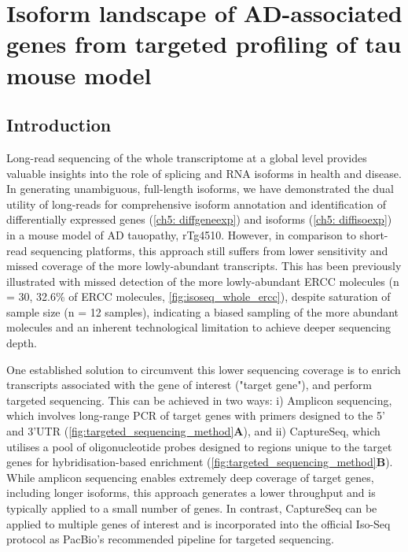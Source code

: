 \chapter{Isoform landscape of AD-associated genes from targeted profiling of tau mouse model}\label{ch: targeted_transcriptome}
\label{targetedmousetranscriptome}


\section{Introduction}
Long-read sequencing of the whole transcriptome at a global level provides valuable insights into the role of splicing and RNA isoforms in health and disease\cite{DePaoli-Iseppi2021}. In generating unambiguous, full-length isoforms, we have demonstrated the dual utility of long-reads for comprehensive isoform annotation and identification of differentially expressed genes (\cref{ch5: diffgeneexp}) and isoforms (\cref{ch5: diffisoexp}) in a mouse model of AD tauopathy, rTg4510. However, in comparison to short-read sequencing platforms, this approach still suffers from lower sensitivity and missed coverage of the more lowly-abundant transcripts\cite{Stark2019}. This has been previously illustrated with missed detection of the more lowly-abundant ERCC molecules (n = 30, 32.6\% of ERCC molecules, \cref{fig:isoseq_whole_ercc}), despite saturation of sample size (n = 12 samples), indicating a biased sampling of the more abundant molecules and an inherent technological limitation to achieve deeper sequencing depth. 

One established solution to circumvent this lower sequencing coverage is to enrich transcripts associated with the gene of interest ("target gene"), and perform targeted sequencing\cite{Sheynkman2020}. This can be achieved in two ways\cite{DePaoli-Iseppi2021}: i) Amplicon sequencing, which involves long-range PCR of target genes with primers designed to the 5' and 3'UTR (\cref{fig:targeted_sequencing_method}\textbf{A}), and ii) CaptureSeq, which utilises a pool of oligonucleotide probes designed to regions unique to the target genes for hybridisation-based enrichment (\cref{fig:targeted_sequencing_method}\textbf{B}). While amplicon sequencing enables extremely deep coverage of target genes, including longer isoforms, this approach generates a lower throughput and is typically applied to a small number of genes. In contrast, CaptureSeq can be applied to multiple genes of interest and is incorporated into the official Iso-Seq protocol as PacBio's recommended pipeline for targeted sequencing\cite{Tseng2019}.  


